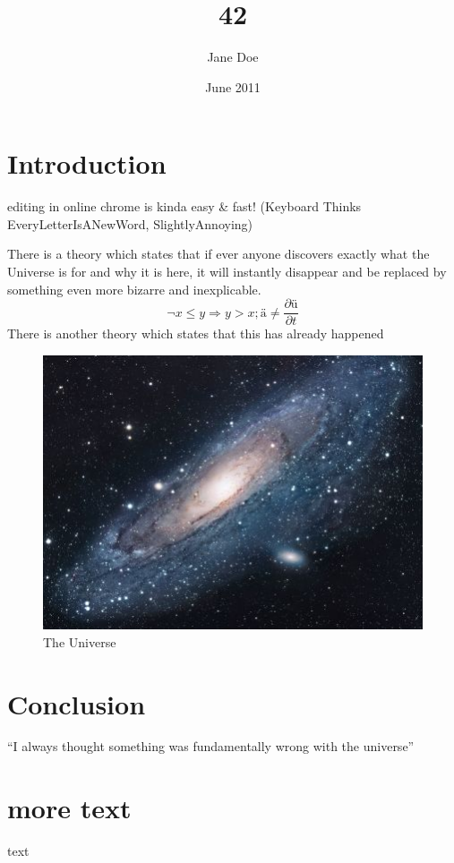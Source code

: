 \documentclass{article}
\title{42}
\author{Jane Doe}
\date{June 2011}
\begin{document}
\maketitle

\section{Introduction}

editing in online chrome is kinda easy \& fast!
(Keyboard Thinks EveryLetterIsANewWord, SlightlyAnnoying)

There is a theory which states that if ever anyone discovers exactly what
 the Universe is for and why it is here, 
it will instantly disappear and be replaced by something even more bizarre 
and inexplicable.
$$¬ x ≤ y ⇒ y > x; ä ≠ \frac{∂ü}{∂t}$$
There is another theory which states that this has already happened

\begin{figure}[h!]
\centering
\includegraphics[scale=1.7]{universe.jpg}
\caption{The Universe}
\label{threadsVsSync}
\end{figure}

\section{Conclusion}
``I always thought something was fundamentally wrong with the universe'' \citep{adams1995hitchhiker}




\section{more text}
text
\end{document}
